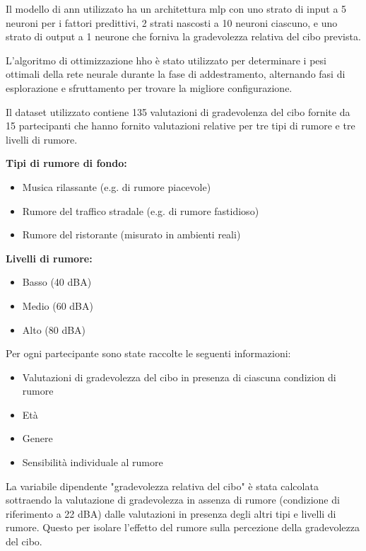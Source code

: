 Il modello di \gls{ann} utilizzato ha un architettura \gls{mlp} con uno strato di input a 5 neuroni per i fattori predittivi, 2 strati nascosti a 10 neuroni ciascuno, e uno strato di output a 1 neurone che forniva la gradevolezza relativa del cibo prevista. 

L'algoritmo di ottimizzazione \gls{hho} è stato utilizzato per determinare i pesi ottimali della rete neurale durante la fase di addestramento, alternando fasi di esplorazione e sfruttamento per trovare la migliore configurazione.

Il dataset utilizzato contiene 135 valutazioni di gradevolenza del cibo fornite da 15 partecipanti che hanno fornito valutazioni relative per tre tipi di rumore e tre livelli di rumore. \cite{Bellmann2019}

\textbf{Tipi di rumore di fondo:}
\begin{itemize}
      \item Musica rilassante (e.g. di rumore piacevole)
      \item Rumore del traffico stradale (e.g. di rumore fastidioso)
      \item Rumore del ristorante (misurato in ambienti reali)
\end{itemize}

\textbf{Livelli di rumore:}
\begin{itemize}
      \item Basso (40 dBA)
      \item Medio (60 dBA)
      \item Alto (80 dBA)
\end{itemize}

Per ogni partecipante sono state raccolte le seguenti informazioni:

\begin{itemize}
      \item Valutazioni di gradevolezza del cibo in presenza di ciascuna condizion di rumore
      \item Età
      \item Genere
      \item Sensibilità individuale al rumore
\end{itemize}

La variabile dipendente "gradevolezza relativa del cibo" è stata calcolata sottraendo la valutazione di gradevolezza in assenza di rumore (condizione di riferimento a 22 dBA) dalle valutazioni in presenza degli altri tipi e livelli di rumore. Questo per isolare l'effetto del rumore sulla percezione della gradevolezza del cibo.

